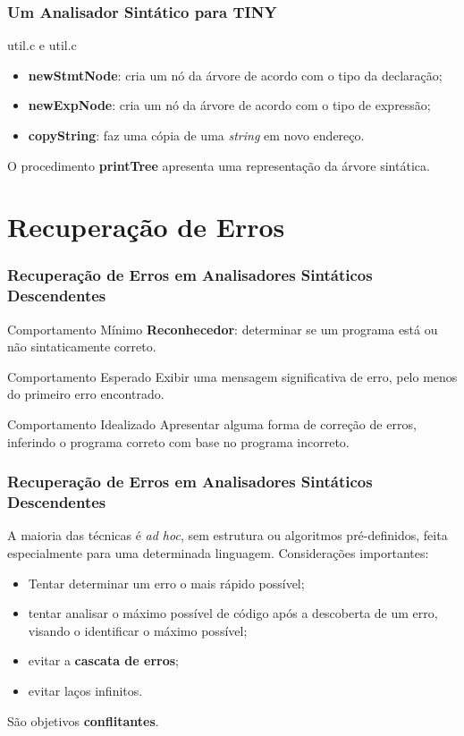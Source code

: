 \documentclass[table]{beamer}
\begin{document}
\begin{frame}[fragile]
   \frametitle{Um Analisador Sintático para TINY}
   \begin{block}{util.c e util.c}
      \begin{itemize}
         \item \textbf{newStmtNode}: cria um nó da árvore de acordo com o tipo da declaração;
	 \item \textbf{newExpNode}: cria um nó da árvore de acordo com o tipo de expressão;
	 \item \textbf{copyString}: faz uma cópia de uma \textit{string} em novo endereço.
      \end{itemize}
   \end{block}
   O procedimento \textbf{printTree} apresenta uma representação da árvore sintática.
\end{frame}

\section{Recuperação de Erros}

\begin{frame}
   \frametitle{Recuperação de Erros em Analisadores Sintáticos Descendentes}
   \begin{block}{Comportamento Mínimo}
   \textbf{Reconhecedor}: determinar se um programa está ou não sintaticamente correto.
   \end{block}
   
   \begin{block}{Comportamento Esperado}
   Exibir uma mensagem significativa de erro, pelo menos do primeiro erro encontrado.
   \end{block}

   \begin{block}{Comportamento Idealizado}
   Apresentar alguma forma de correção de erros, inferindo o programa correto com base no programa incorreto.
   \end{block}
\end{frame}

\begin{frame}
   \frametitle{Recuperação de Erros em Analisadores Sintáticos Descendentes}
   A maioria das técnicas é \textit{ad hoc}, sem estrutura ou algoritmos pré-definidos, feita especialmente para uma determinada linguagem. Considerações importantes:
   \begin{itemize}
      \item Tentar determinar um erro o mais rápido possível;
      \item tentar analisar o máximo possível de código após a descoberta de um erro, visando o identificar o máximo possível;
      \item evitar a \textbf{cascata de erros};
      \item evitar laços infinitos.
   \end{itemize}
   São objetivos \textbf{conflitantes}.
\end{frame}
\end{document}
